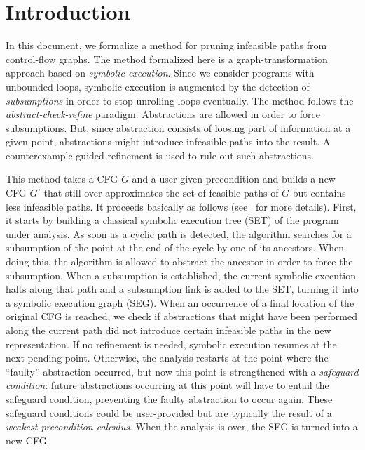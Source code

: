 \section{Introduction}

In this document, we formalize a method for pruning infeasible paths from control-flow 
graphs. The method formalized here is a graph-transformation approach based on \emph{symbolic 
execution}. Since we consider programs with unbounded loops, symbolic execution
is augmented by the 
detection of \emph{subsumptions} in order to stop unrolling loops eventually. The method follows the 
\emph{abstract-check-refine} paradigm. Abstractions are allowed in order to force 
subsumptions. But, since abstraction consists of loosing part of information at a given point, 
abstractions might introduce infeasible paths into the result. A counterexample guided refinement 
is used to rule out such abstractions. 

This method takes a CFG $G$ and a user given precondition and builds a new CFG $G'$ that still 
over-approximates the set of feasible paths of $G$ but contains less infeasible paths. 
It proceeds basically as follows (see~\cite{AGVW2016} for more details). 
First, it starts by building a classical symbolic execution tree (SET) of the program under analysis. 
As soon as a cyclic path is detected, the algorithm searches for a subsumption of the point at the 
end of the cycle by one of its ancestors. When doing this, the algorithm is allowed to abstract 
the ancestor in order to force the subsumption. When a subsumption is established, the current 
symbolic execution halts along that path and a subsumption link is added to the SET, turning it into 
a symbolic execution graph (SEG). When an occurrence of a final location of the original CFG 
is reached, we check if abstractions that might have been performed along the current path did not 
introduce certain infeasible paths in the new representation. If no refinement is needed, symbolic 
execution resumes at the next pending point. Otherwise, the analysis restarts at the point where the 
``faulty'' abstraction occurred, but now this point is strengthened with a \emph{safeguard 
condition}: future abstractions occurring at this point will have to entail the safeguard 
condition, preventing the faulty abstraction to occur again. These safeguard conditions could be 
user-provided but are typically the result of a \emph{weakest precondition calculus}. When the 
analysis is over, the SEG is turned into a new CFG.

